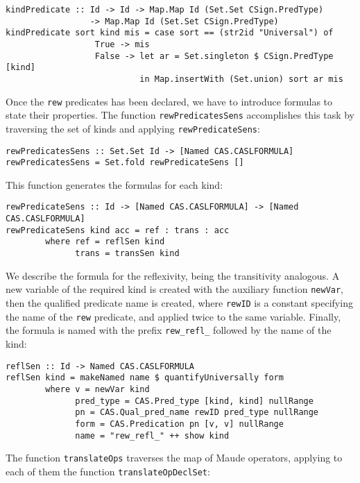 {\codesize
\begin{verbatim}
kindPredicate :: Id -> Id -> Map.Map Id (Set.Set CSign.PredType)
                 -> Map.Map Id (Set.Set CSign.PredType)
kindPredicate sort kind mis = case sort == (str2id "Universal") of
                  True -> mis
                  False -> let ar = Set.singleton $ CSign.PredType [kind]
                           in Map.insertWith (Set.union) sort ar mis
\end{verbatim}
}

Once the \verb"rew" predicates has been declared, we have to introduce
formulas to state their properties. The function \verb"rewPredicatesSens"
accomplishes this task by traversing the set of kinds and applying
\verb"rewPredicateSens":

{\codesize
\begin{verbatim}
rewPredicatesSens :: Set.Set Id -> [Named CAS.CASLFORMULA]
rewPredicatesSens = Set.fold rewPredicateSens []
\end{verbatim}
}

This function generates the formulas for each kind:

{\codesize
\begin{verbatim}
rewPredicateSens :: Id -> [Named CAS.CASLFORMULA] -> [Named CAS.CASLFORMULA]
rewPredicateSens kind acc = ref : trans : acc
        where ref = reflSen kind
              trans = transSen kind
\end{verbatim}
}

We describe the formula for the reflexivity, being the transitivity
analogous. A new variable of the required kind is created with
the auxiliary function \verb"newVar", then the qualified predicate
name is created, where \verb"rewID" is a constant specifying the
name of the \verb"rew" predicate, and applied twice to the same
variable. Finally, the formula is named with the prefix \verb"rew_refl_"
followed by the name of the kind:

{\codesize
\begin{verbatim}
reflSen :: Id -> Named CAS.CASLFORMULA
reflSen kind = makeNamed name $ quantifyUniversally form
        where v = newVar kind
              pred_type = CAS.Pred_type [kind, kind] nullRange
              pn = CAS.Qual_pred_name rewID pred_type nullRange
              form = CAS.Predication pn [v, v] nullRange
              name = "rew_refl_" ++ show kind
\end{verbatim}
}

The function \verb"translateOps" traverses the map of Maude operators,
applying to each of them the function \verb"translateOpDeclSet":

